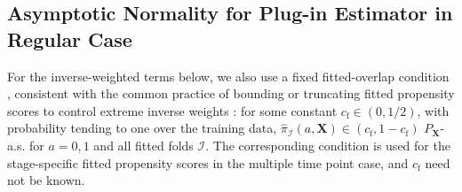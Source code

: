 \documentclass[11pt]{article}
\theoremstyle{referenceplain}
\theoremstyle{referencedefinition}
\theoremstyle{referenceremark}
\begin{document}
\subsection{Asymptotic Normality for Plug-in Estimator in Regular Case}
{For the inverse-weighted terms below, we also use a fixed fitted-overlap condition \citep{chernozhukov2018double,shi2020breaking}, consistent with the common practice of bounding or truncating fitted propensity scores to control extreme inverse weights \citep{kang2007demystifying,tan2010bounded,ju2019adaptive}: for some constant $c_{\mathrm f}\in(0,1/2)$, with probability tending to one over the training data, $\widehat{\pi}_{\mathcal I}(a,\mathbf X)\in(c_{\mathrm f},1-c_{\mathrm f})$ $P_{\mathbf X}$-a.s. for $a=0,1$ and all fitted folds $\mathcal I$. The corresponding condition is used for the stage-specific fitted propensity scores in the multiple time point case, and $c_{\mathrm f}$ need not be known.}
\end{document}
